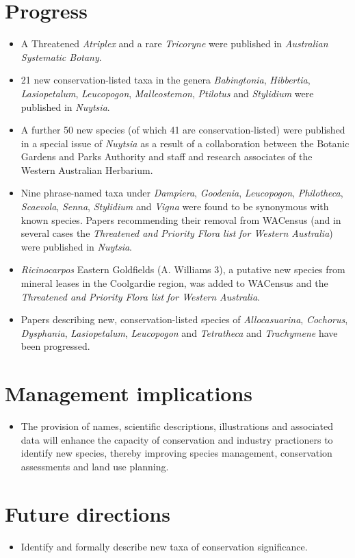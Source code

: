 \documentclass[version=last,
    paper=a4, %
    10pt, %
    usenames,
    dvipsnames,
    oneside, %
    headings=openany, %
    DIV=15 %
]{scrbook}
\begin{document}
\section*{Progress}
\begin{itemize}
\itemsep1pt\parskip0pt
\item
  A Threatened \emph{Atriplex} and a rare \emph{Tricoryne} were
  published in \emph{Australian Systematic Botany}.
\item
  21 new conservation-listed taxa in the genera \emph{Babingtonia},
  \emph{Hibbertia}, \emph{Lasiopetalum}, \emph{Leucopogon},
  \emph{Malleostemon}, \emph{Ptilotus} and \emph{Stylidium} were
  published in \emph{Nuytsia}.
\item
  A further 50 new species (of which 41 are conservation-listed) were
  published in a special issue of \emph{Nuytsia} as a result of a
  collaboration between the Botanic Gardens and Parks Authority and
  staff and research associates of the Western Australian Herbarium.
\item
  Nine phrase-named taxa under \emph{Dampiera}, \emph{Goodenia},
  \emph{Leucopogon}, \emph{Philotheca}, \emph{Scaevola}, \emph{Senna},
  \emph{Stylidium} and \emph{Vigna} were found to be synonymous with
  known species. Papers recommending their removal from WACensus (and in
  several cases the \emph{Threatened and Priority Flora list} \emph{for
  Western Australia}) were published in \emph{Nuytsia}.
\item
  \emph{Ricinocarpos} Eastern Goldfields (A. Williams 3), a putative new
  species from mineral leases in the Coolgardie region, was added to
  WACensus and the \emph{Threatened and Priority Flora list} \emph{for
  Western Australia}.
\item
  Papers describing new, conservation-listed species of
  \emph{Allocasuarina}, \emph{Cochorus}, \emph{Dysphania},
  \emph{Lasiopetalum}, \emph{Leucopogon} and \emph{Tetratheca} and
  \emph{Trachymene} have been progressed.
\end{itemize}



\section*{Management implications}
\begin{itemize}
\itemsep1pt\parskip0pt
\item
  The provision of names, scientific descriptions, illustrations and
  associated data will enhance the capacity of conservation and industry
  practioners to identify new species, thereby improving species
  management, conservation assessments and land use planning.
\end{itemize}



\section*{Future directions}
\begin{itemize}
\itemsep1pt\parskip0pt
\item
  Identify and formally describe new taxa of conservation significance.
\end{itemize}



\end{document}
